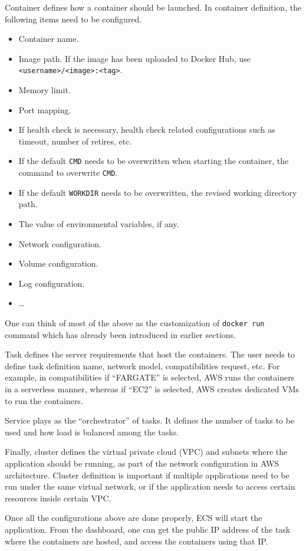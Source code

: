 Container defines how a container should be launched. In container definition, the following items need to be configured.
\begin{itemize}
  \item Container name.
  \item Image path. If the image has been uploaded to Docker Hub, use \texttt{<username>/<image>:<tag>}.
  \item Memory limit.
  \item Port mapping.
  \item If health check is necessary, health check related configurations such as timeout, number of retires, etc.
  \item If the default \verb|CMD| needs to be overwritten when starting the container, the command to overwrite \verb|CMD|.
  \item If the default \verb|WORKDIR| needs to be overwritten, the revised working directory path.
  \item The value of environmental variables, if any.
  \item Network configuration.
  \item Volume configuration.
  \item Log configuration.
  \item \ldots
\end{itemize}
One can think of most of the above as the customization of \verb|docker run| command which has already been introduced in earlier sections.

Task defines the server requirements that host the containers. The user needs to define task definition name, network model, compatibilities request, etc. For example, in compatibilities if ``FARGATE'' is selected, AWS runs the containers in a serverless manner, whereas if ``EC2'' is selected, AWS creates dedicated VMs to run the containers.

Service plays as the ``orchestrator'' of tasks. It defines the number of tasks to be used and how load is balanced among the tasks.

Finally, cluster defines the virtual private cloud (VPC) and subnets where the application should be running, as part of the network configuration in AWS architecture. Cluster definition is important if multiple applications need to be run under the same virtual network, or if the application needs to access certain resources inside certain VPC.

Once all the configurations above are done properly, ECS will start the application. From the dashboard, one can get the public IP address of the task where the containers are hosted, and access the containers using that IP.

